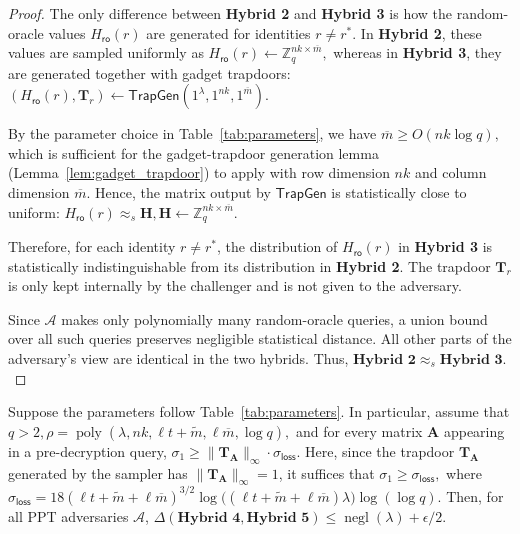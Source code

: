 \noindent\begin{proof}
The only difference between \textbf{Hybrid 2} and \textbf{Hybrid 3} is how
the random-oracle values $H_{\mathsf{ro}}(r)$ are generated for identities
$r\neq r^\ast$. In \textbf{Hybrid 2}, these values are sampled uniformly as
$
    H_{\mathsf{ro}}(r)
    \gets
    \mathbb Z_q^{nk\times \overline m},
$
whereas in \textbf{Hybrid 3}, they are generated together with gadget
trapdoors:
$
    (H_{\mathsf{ro}}(r),\mathbf T_r)
    \gets
    \mathsf{TrapGen}(1^\lambda,1^{nk},1^{\overline m}).
$

By the parameter choice in Table~\ref{tab:parameters}, we have
$
    \overline m \ge O(nk\log q),
$
which is sufficient for the gadget-trapdoor generation lemma
(Lemma~\ref{lem:gadget_trapdoor}) to apply with row dimension $nk$ and
column dimension $\overline m$. Hence, the matrix output by
$\mathsf{TrapGen}$ is statistically close to uniform:
$
    H_{\mathsf{ro}}(r)
    \approx_s
    \mathbf H,
    \mathbf H\gets \mathbb Z_q^{nk\times \overline m}.
$

Therefore, for each identity $r\neq r^\ast$, the distribution of
$H_{\mathsf{ro}}(r)$ in \textbf{Hybrid 3} is statistically indistinguishable
from its distribution in \textbf{Hybrid 2}. The trapdoor $\mathbf T_r$ is
only kept internally by the challenger and is not given to the adversary.

Since $\mathcal A$ makes only polynomially many random-oracle queries, a
union bound over all such queries preserves negligible statistical distance.
All other parts of the adversary's view are identical in the two hybrids.
Thus,
$
    \textbf{Hybrid 2} \approx_s \textbf{Hybrid 3}.
$
\end{proof}
\noindent\begin{lemma}
Suppose the parameters follow Table~\ref{tab:parameters}. In particular,
assume that
$
    q>2,
    \rho
    =
    \operatorname{poly}
    (\lambda,nk,\ell t+\widetilde m,\ell\overline m,\log q),
$
and for every matrix $\mathbf A$ appearing in a pre-decryption query,
$
    \sigma_1
    \ge
    \|\mathbf T_{\mathbf A}\|_{\infty}
    \cdot
    \sigma_{\mathsf{loss}}.
$
Here, since the trapdoor $\mathbf T_{\mathbf A}$ generated by the sampler has
$\|\mathbf T_{\mathbf A}\|_{\infty}=1$, it suffices that
$
    \sigma_1
    \ge
    \sigma_{\mathsf{loss}},
$
where
$
    \sigma_{\mathsf{loss}}
    =
    18(\ell t+\widetilde m+\ell\overline m)^{3/2}
    \log\!\bigl((\ell t+\widetilde m+\ell\overline m)\lambda\bigr)
    \log(\log q).
$
Then, for all PPT adversaries $\mathcal A$,
$
    \Delta(\textbf{Hybrid 4},\textbf{Hybrid 5})
    \le
    \operatorname{negl}(\lambda)+\epsilon/2.
$
\end{lemma}

